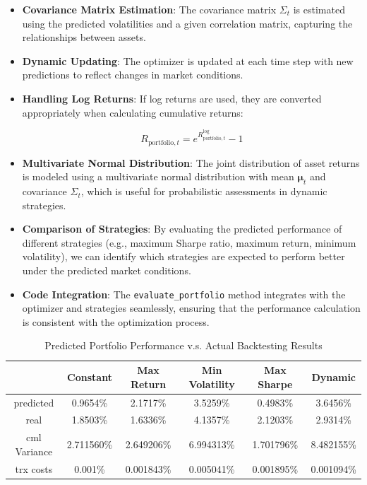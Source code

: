 \begin{itemize}
    \item \textbf{Covariance Matrix Estimation}: The covariance matrix \( \Sigma_t \) is estimated using the predicted volatilities and a given correlation matrix, capturing the relationships between assets.

    \item \textbf{Dynamic Updating}: The optimizer is updated at each time step with new predictions to reflect changes in market conditions.

    \item \textbf{Handling Log Returns}: If log returns are used, they are converted appropriately when calculating cumulative returns:

    \[
    R_{\text{portfolio}, t} = e^{R_{\text{portfolio}, t}^{\text{log}}} - 1
    \]

    \item \textbf{Multivariate Normal Distribution}: The joint distribution of asset returns is modeled using a multivariate normal distribution with mean \( \boldsymbol{\mu}_t \) and covariance \( \Sigma_t \), which is useful for probabilistic assessments in dynamic strategies.

    \item \textbf{Comparison of Strategies}: By evaluating the predicted performance of different strategies (e.g., maximum Sharpe ratio, maximum return, minimum volatility), we can identify which strategies are expected to perform better under the predicted market conditions.

    \item \textbf{Code Integration}: The \texttt{evaluate\_portfolio} method integrates with the optimizer and strategies seamlessly, ensuring that the performance calculation is consistent with the optimization process.
\end{itemize}

\begin{table}[htbp]
\centering
\caption{Predicted Portfolio Performance v.s. Actual Backtesting Results}
\label{tab:predicted_vs_actual}
\begin{tabular}{c|ccccc}
\toprule
 &\textbf{Constant} & \textbf{Max Return} & \textbf{Min Volatility} & \textbf{Max Sharpe} & \textbf{Dynamic} \\
\midrule
predicted&0.9654\%  & 2.1717\% & 3.5259\% & 0.4983\% & 3.6456\% \\
real&1.8503\% & 1.6336\% & 4.1357\% & 2.1203\% & 2.9314\% \\
cml Variance& 2.711560\% & 2.649206\% & 6.994313\% & 1.701796\% & 8.482155\% \\
trx costs&0.001\% & 0.001843\% & 0.005041\% & 0.001895\% & 0.001094\% \\


\bottomrule
\end{tabular}
\end{table}

